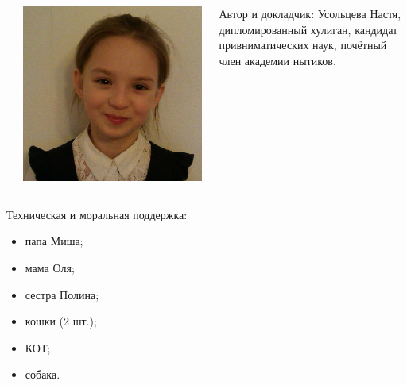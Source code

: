 \begin{frame}
\begin{columns}
{{\begin{center}
                    \end{center}
                }
            }
             {
                \begin{center}
                    \includegraphics[width=.8\textwidth]{fig/nastyaOfficial}
                \end{center}
            }
        
            \alert{Автор и докладчик}: Усольцева Настя, дипломированный хулиган, кандидат привниматических наук, почётный член академии нытиков.
    \end{columns}    
    
    \par\bigskip
    
    \alert{Техническая и моральная поддержка}:
    \begin{itemize}
        \item папа Миша;
        \item мама Оля;
        \item сестра Полина;
        \item кошки (2 шт.);
        \item \alert{КОТ};
        \item собака.
    \end{itemize}
    
\end{frame}

